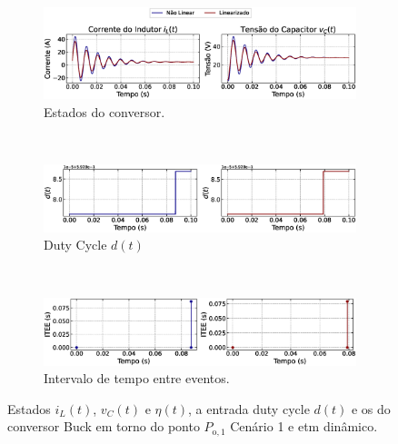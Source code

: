 \begin{figure}[H]
  \centering
  \captionsetup{justification=centering}
  \begin{subfigure}{1.\textwidth}
    \centering
    \includegraphics[width=1.\textwidth]{figuras/dynamic-etm/buck/sim1/op1/result.eps}
    \caption{Estados do conversor.}
    \label{fig:buck_converter_constant_pcpl_dynamic_etm_op1_a}
  \end{subfigure}
  \\[6pt]
  \begin{subfigure}{1.\textwidth}
    \centering
    \includegraphics[width=1.\textwidth]{figuras/dynamic-etm/buck/sim1/op1/duty-cycle.eps}
    \caption{Duty Cycle $d(t)$}
    \label{fig:buck_converter_constant_pcpl_dynamic_etm_op1_b}
  \end{subfigure}
  \\[6pt]
  \begin{subfigure}{1.\textwidth}
    \centering
    \includegraphics[width=1.\textwidth]{figuras/dynamic-etm/buck/sim1/op1/inter-event-times.eps}
    \caption{Intervalo de tempo entre eventos.}
    \label{fig:buck_converter_constant_pcpl_dynamic_etm_op1_c}
  \end{subfigure}
  \caption{Estados $i_L(t)$, $v_C(t)$ e $\eta(t)$, a entrada duty cycle $d(t)$ e os  do conversor Buck em torno do ponto $P_{\mathrm{o}, 1}$ Cenário 1 e \acrshort{etm} dinâmico.}
  \label{fig:buck_converter_constant_pcpl_dynamic_etm_op1}
\end{figure}

